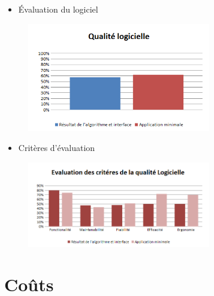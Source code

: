 \documentclass[xcolor=dvipsnames]{beamer}
\begin{document}
	\begin{frame}{\secname}
		\begin{itemize}
			\item \'Evaluation du logiciel 
		\end{itemize}
		\begin{figure}
			\includegraphics[width=8cm]{Images/QualiteLogicielle.png} %
		\end{figure}
	\end{frame}


	\begin{frame}{\secname}
		\begin{itemize}
			\item Crit\`eres d'\'evaluation
		\end{itemize}
		\begin{figure}
			\includegraphics[width=8cm]{Images/EvaluationCriteres.png} %
		\end{figure}
	\end{frame}




\section{Co\^uts}
\end{document}
